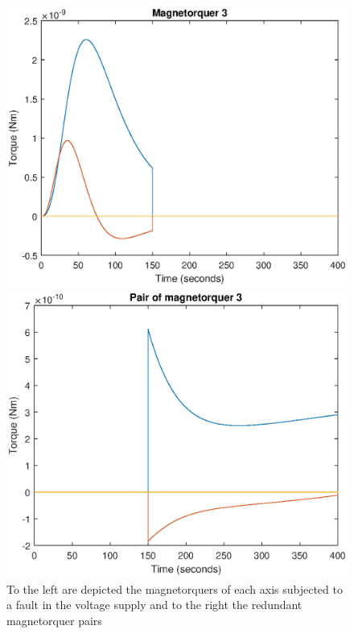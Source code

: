 \begin{figure}[ht]  
	\begin{minipage}{0.5\textwidth}
		\includegraphics[width=\textwidth]{figures/config3.eps}
	\end{minipage}
	\hfill
	\begin{minipage}{0.5\textwidth}
		\includegraphics[width=\textwidth]{figures/config33.eps}
	\end{minipage}
	\caption{To the left are depicted the magnetorquers of each axis subjected to a fault in the voltage supply and to the right the redundant magnetorquer pairs}
	\label{fig:magneticconfig}
\end{figure}  
%



